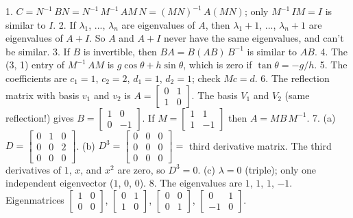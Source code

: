1. \(C=N^{-1}\,BN=N^{-1}\,M^{-1}\,AM\,N=(MN)^{-1}\,A(MN)\); only \(M^{-1}\,IM=I\) is similar to \(I\).
2. If \(\lambda_{1}\), ..., \(\lambda_{n}\) are eigenvalues of \(A\), then \(\lambda_{1}+1\), ..., \(\lambda_{n}+1\) are eigenvalues of \(A+I\). So \(A\) and \(A+I\) never have the same eigenvalues, and can't be similar.
3. If \(B\) is invertible, then \(BA=B(AB)\,B^{-1}\) is similar to \(AB\).
4. The (3, 1) entry of \(M^{-1}\,AM\) is \(g\cos\theta+h\sin\theta\), which is zero if \(\tan\theta=-g/h\).
5. The coefficients are \(c_{1}=1\), \(c_{2}=2\), \(d_{1}=1\), \(d_{2}=1\); check \(Mc=d\).
6. The reflection matrix with basis \(v_{1}\) and \(v_{2}\) is \(A=\left[\begin{array}{cc}0&1\\ 1&0\end{array}\right]\). The basis \(V_{1}\) and \(V_{2}\) (same reflection!) gives \(B=\left[\begin{array}{cc}1&0\\ 0&-1\end{array}\right]\). If \(M=\left[\begin{array}{cc}1&1\\ 1&-1\end{array}\right]\) then \(A=MB\,M^{-1}\).
7. (a) \(D=\left[\begin{array}{cc}0&1&0\\ 0&0&2\\ 0&0&0\end{array}\right]\). (b) \(D^{3}=\left[\begin{array}{cc}0&0&0\\ 0&0&0\\ 0&0&0\end{array}\right]=\) third derivative matrix. The third derivatives of \(1\), \(x\), and \(x^{2}\) are zero, so \(D^{3}=0\). (c) \(\lambda=0\) (triple); only one independent eigenvector (\(1\), \(0\), \(0\)).
8. The eigenvalues are \(1\), \(1\), \(1\), \(-1\). Eigenmatrices \(\left[\begin{array}{cc}1&0\\ 0&0\end{array}\right]\), \(\left[\begin{array}{cc}0&1\\ 1&0\end{array}\right]\), \(\left[\begin{array}{cc}0&0\\ 0&1\end{array}\right]\), \(\left[\begin{array}{cc}0&1\\ -1&0\end{array}\right]\).
